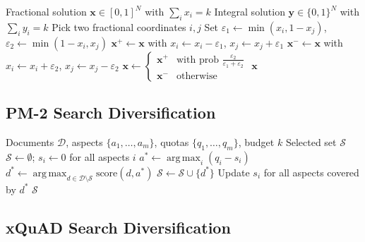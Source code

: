 \documentclass[11pt]{article}
\DeclareMathOperator*{\argmax}{arg\,max}
\begin{document}
\begin{algorithm}[H]
\caption{Pipage Rounding~\citep{calinescu2011maximizing}}
\label{alg:pipage}
\begin{algorithmic}[1]
\Require Fractional solution $\mathbf{x} \in [0,1]^N$ with $\sum_i x_i = k$
\Ensure Integral solution $\mathbf{y} \in \{0,1\}^N$ with $\sum_i y_i = k$
  \State Pick two fractional coordinates $i, j$
  \State Set $\varepsilon_1 \gets \min(x_i, 1 - x_j)$, $\varepsilon_2 \gets \min(1 - x_i, x_j)$
  \State $\mathbf{x}^+ \gets \mathbf{x}$ with $x_i \gets x_i - \varepsilon_1$, $x_j \gets x_j + \varepsilon_1$
  \State $\mathbf{x}^- \gets \mathbf{x}$ with $x_i \gets x_i + \varepsilon_2$, $x_j \gets x_j - \varepsilon_2$
  \State $\mathbf{x} \gets \begin{cases} \mathbf{x}^+ & \text{with prob } \frac{\varepsilon_2}{\varepsilon_1 + \varepsilon_2} \\ \mathbf{x}^- & \text{otherwise} \end{cases}$
\EndWhile
\State \Return $\mathbf{x}$
\end{algorithmic}
\end{algorithm}

\subsection{PM-2 Search Diversification}

\begin{algorithm}[H]
\caption{PM-2: Proportional Multiwinner Diversification~\citep{dang2012diversity}}
\label{alg:pm2}
\begin{algorithmic}[1]
\Require Documents $\mathcal{D}$, aspects $\{a_1,\ldots,a_m\}$, quotas $\{q_1,\ldots,q_m\}$, budget $k$
\Ensure Selected set $\mathcal{S}$
\State $\mathcal{S} \gets \emptyset$; $s_i \gets 0$ for all aspects $i$
  \State $a^* \gets \argmax_i (q_i - s_i)$ 
  \State $d^* \gets \argmax_{d \in \mathcal{D} \setminus \mathcal{S}} \text{score}(d, a^*)$
  \State $\mathcal{S} \gets \mathcal{S} \cup \{d^*\}$
  \State Update $s_i$ for all aspects covered by $d^*$
\EndFor
\State \Return $\mathcal{S}$
\end{algorithmic}
\end{algorithm}

\subsection{xQuAD Search Diversification}
\end{document}
